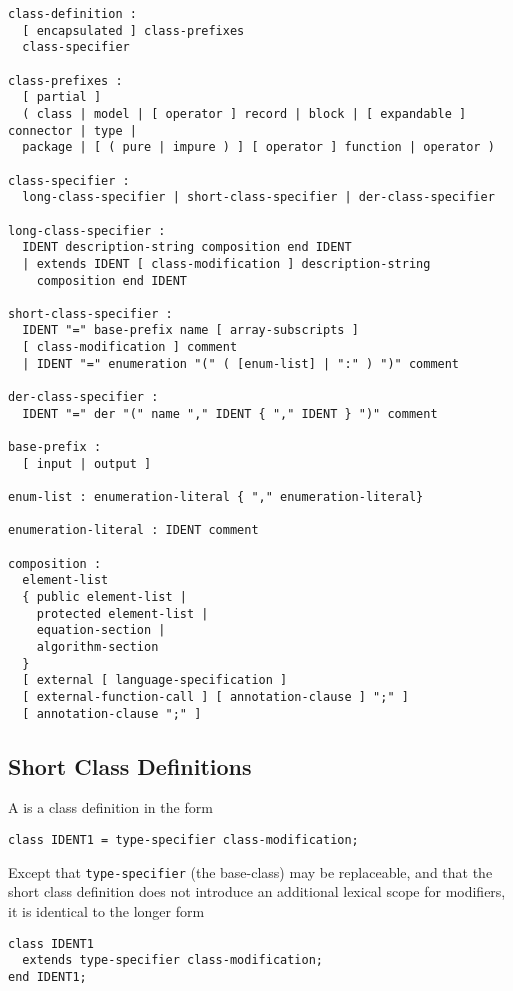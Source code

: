 \begin{lstlisting}[language=grammar]
class-definition :
  [ encapsulated ] class-prefixes
  class-specifier

class-prefixes :
  [ partial ]
  ( class | model | [ operator ] record | block | [ expandable ] connector | type |
  package | [ ( pure | impure ) ] [ operator ] function | operator )

class-specifier :
  long-class-specifier | short-class-specifier | der-class-specifier

long-class-specifier :
  IDENT description-string composition end IDENT
  | extends IDENT [ class-modification ] description-string
    composition end IDENT

short-class-specifier :
  IDENT "=" base-prefix name [ array-subscripts ]
  [ class-modification ] comment
  | IDENT "=" enumeration "(" ( [enum-list] | ":" ) ")" comment

der-class-specifier :
  IDENT "=" der "(" name "," IDENT { "," IDENT } ")" comment

base-prefix :
  [ input | output ]

enum-list : enumeration-literal { "," enumeration-literal}

enumeration-literal : IDENT comment

composition :
  element-list
  { public element-list |
    protected element-list |
    equation-section |
    algorithm-section
  }
  [ external [ language-specification ]
  [ external-function-call ] [ annotation-clause ] ";" ]
  [ annotation-clause ";" ]
\end{lstlisting}

\subsection{Short Class Definitions}\label{short-class-definitions}

A  is a class definition in the form
\begin{lstlisting}[language=modelica]
class IDENT1 = type-specifier class-modification;
\end{lstlisting}
Except that \lstinline!type-specifier! (the base-class) may be replaceable, and that the short class definition does not introduce an additional lexical scope for modifiers, it is identical to the longer form
\begin{lstlisting}[language=modelica]
class IDENT1
  extends type-specifier class-modification;
end IDENT1;
\end{lstlisting}

